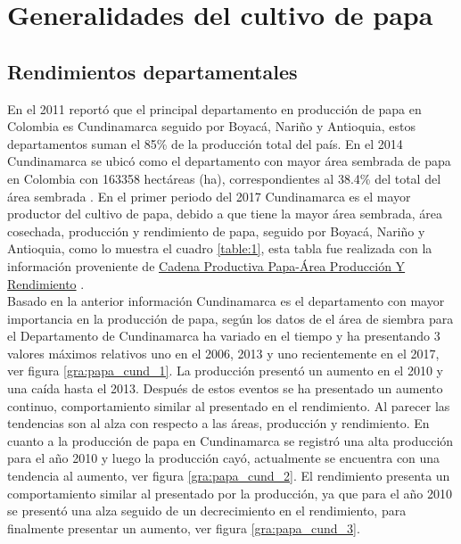 \documentclass[11pt]{article}
\begin{document}
\section{Generalidades del cultivo de papa}

\subsection{Rendimientos departamentales}

En el 2011 \citet{Rojas2011} reportó que el principal departamento en producción de papa en Colombia es Cundinamarca seguido por Boyacá, Nariño y Antioquia, estos departamentos suman el 85\% de la producción total del país. En el 2014 Cundinamarca se ubicó como el departamento con mayor área sembrada de papa en Colombia con 163358 hectáreas (ha), correspondientes al 38.4\% del total del área sembrada \citet{MADR2014}. En el primer periodo del 2017 Cundinamarca es el mayor productor del cultivo de papa, debido a que tiene la mayor área sembrada, área cosechada, producción y rendimiento de papa, seguido por Boyacá, Nariño y Antioquia, como lo muestra el cuadro \ref{table:1}, esta tabla fue realizada con la información proveniente de \textcolor{blue}{ \href{https://www.datos.gov.co/Agricultura-y-Desarrollo-Rural/Cadena-Productiva-Papa-Area-Producci-n-Y-Rendimien/pnsj-t3kh}{Cadena Productiva Papa-Área Producción Y Rendimiento}} \citep{madr2017}.\\

Basado en la anterior información Cundinamarca es el departamento con mayor importancia en la producción de papa, según los datos de \citep{madr2017} el área de siembra para el Departamento de Cundinamarca ha variado en el tiempo y ha presentando 3 valores máximos relativos uno en el 2006, 2013 y uno recientemente en el 2017, ver figura \ref{gra:papa_cund_1}. La producción presentó un aumento en el 2010 y una caída hasta el 2013. Después de estos eventos se ha presentado un aumento continuo, comportamiento similar al presentado en el rendimiento. Al parecer las tendencias son al alza con respecto a las áreas, producción y rendimiento. En cuanto a la producción de papa en Cundinamarca se registró una alta producción para el año 2010 y luego la producción cayó, actualmente se encuentra con una tendencia al aumento, ver figura \ref{gra:papa_cund_2}. El rendimiento presenta un comportamiento similar al presentado por la producción, ya que para el año 2010 se presentó una alza seguido de un decrecimiento en el rendimiento, para finalmente presentar un aumento, ver figura \ref{gra:papa_cund_3}.
\end{document}
